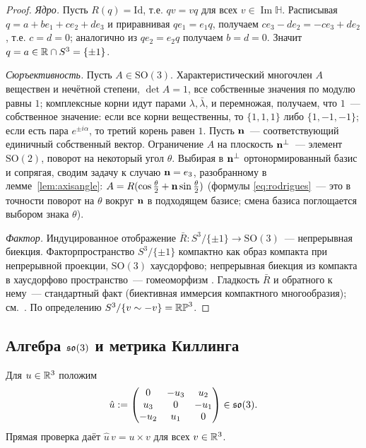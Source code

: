 \begin{proof}
\emph{Ядро.} Пусть $R(q) = \mathrm{Id}$, т.е. $qv = vq$ для всех
$v \in \operatorname{Im}\mathbb H$. Расписывая $q = a + be_1 + ce_2 + de_3$
и приравнивая $qe_1 = e_1q$, получаем $ce_3 - de_2 = -ce_3 + de_2$, т.е.
$c = d = 0$; аналогично из $qe_2 = e_2q$ получаем $b = d = 0$.
Значит $q = a \in \mathbb{R} \cap S^3 = \{\pm1\}$.

\emph{Сюръективность.} Пусть $A \in \mathrm{SO}(3)$. Характеристический
многочлен $A$ веществен и нечётной степени, $\det A = 1$, все собственные
значения по модулю равны $1$; комплексные корни идут парами
$\lambda, \bar\lambda$, и перемножая, получаем, что $1$~--- собственное
значение: если все корни вещественны, то $\{1,1,1\}$ либо
$\{1,-1,-1\}$; если есть пара $e^{\pm i\alpha}$, то третий корень равен
$1$. Пусть $\mathbf{n}$~--- соответствующий единичный собственный вектор.
Ограничение $A$ на плоскость $\mathbf{n}^\perp$~--- элемент $\mathrm{SO}(2)$,
поворот на некоторый угол $\theta$. Выбирая в $\mathbf{n}^\perp$
ортонормированный базис и сопрягая, сводим задачу к случаю
$\mathbf{n} = e_3$, разобранному в лемме~\ref{lem:axisangle}:
$A = R(\cos\tfrac\theta2 + \mathbf{n}\sin\tfrac\theta2)$ (формулы
\eqref{eq:rodrigues}~--- это в точности поворот на $\theta$ вокруг $\mathbf{n}$
в подходящем базисе; смена базиса поглощается выбором знака $\theta$).

\emph{Фактор.} Индуцированное отображение $\bar R\colon S^3/\{\pm1\} \to
\mathrm{SO}(3)$~--- непрерывная биекция. Факторпространство $S^3/\{\pm1\}$
компактно как образ компакта при непрерывной проекции, $\mathrm{SO}(3)$
хаусдорфово; непрерывная биекция из компакта в хаусдорфово пространство~---
гомеоморфизм \cite{marsdenratiu}. Гладкость $\bar R$ и обратного к нему~--- стандартный факт (биективная иммерсия компактного многообразия);
см.~\cite{marsdenratiu}. По определению $S^3/\{v\sim -v\} = \mathbb{RP}^3$.
\end{proof}

\subsection{Алгебра \texorpdfstring{$\mathfrak{so}(3)$}{so(3)} и метрика Киллинга}

\begin{definition}\label{def:hat}
Для $u \in \mathbb{R}^3$ положим
\[
  \hat u := \begin{pmatrix} 0 & -u_3 & u_2\\ u_3 & 0 & -u_1\\ -u_2 & u_1 & 0 \end{pmatrix}
  \in \mathfrak{so}(3) .
\]
Прямая проверка даёт $\hat u\, v = u \times v$ для всех $v \in \mathbb{R}^3$.
\end{definition}

